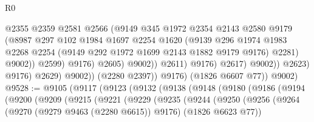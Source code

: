 \begin{lexlean}{R0}
\begin{coremodule}
                                          @2355
                                          @2359
                                          @2581
                                          @2566
                                          (@9149
                                            @345
                                            @1972
                                            @2354
                                            @2143
                                            @2580
                                            @9179
                                            (@8987
                                              @297
                                              @102
                                              @1984
                                              @1697
                                              @2254
                                              @1620
                                              (@9139
                                                @296
                                                @1974
                                                @1983
                                                @2268
                                                @2254
                                                (@9149 @292 @1972 @1699 @2143 @1882 @9179 @9176)
                                                @2281)
                                              @9002))
                                          @2599)
                                        @9176)
                                      @2605)
                                    @9002))
                                @2611)
                              @9176)
                            @2617)
                          @9002))
                      @2623)
                    @9176)
                  @2629)
                @9002))
            (@2280 @2397))
          @9176)
        (@1826 @6607 @77))
      @9002)
@9528 := @9105
    (@9117
      (@9123
        (@9132
          (@9138
            (@9148
              (@9180
                (@9186
                  (@9194
                    (@9200
                      (@9209
                        (@9215
                          (@9221
                            (@9229
                              (@9235
                                (@9244
                                  (@9250
                                    (@9256
                                      (@9264
                                        (@9270 (@9279 @9463 (@2280 @6615)) @9176)
                                        (@1826 @6623 @77))

\end{coremodule}
\end{lexlean}
